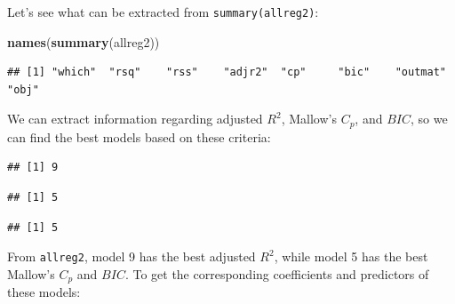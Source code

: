 \documentclass[
]{book}
\newenvironment{Shaded}{\begin{snugshade}}{\end{snugshade}}
\newcommand{\FunctionTok}[1]{\textcolor[rgb]{0.13,0.29,0.53}{\textbf{#1}}}
\newcommand{\NormalTok}[1]{#1}
\newcommand{\SpecialCharTok}[1]{\textcolor[rgb]{0.81,0.36,0.00}{\textbf{#1}}}
\begin{document}
Let's see what can be extracted from \texttt{summary(allreg2)}:

\begin{Shaded}
\begin{Highlighting}[]
\FunctionTok{names}\NormalTok{(}\FunctionTok{summary}\NormalTok{(allreg2))}
\end{Highlighting}
\end{Shaded}

\begin{verbatim}
## [1] "which"  "rsq"    "rss"    "adjr2"  "cp"     "bic"    "outmat" "obj"
\end{verbatim}

We can extract information regarding adjusted \(R^2\), Mallow's \(C_p\), and \(BIC\), so we can find the best models based on these criteria:

\begin{Shaded}
\end{Shaded}

\begin{verbatim}
## [1] 9
\end{verbatim}

\begin{Shaded}
\end{Shaded}

\begin{verbatim}
## [1] 5
\end{verbatim}

\begin{Shaded}
\end{Shaded}

\begin{verbatim}
## [1] 5
\end{verbatim}

From \texttt{allreg2}, model 9 has the best adjusted \(R^2\), while model 5 has the best Mallow's \(C_p\) and \(BIC\). To get the corresponding coefficients and predictors of these models:
\end{document}
